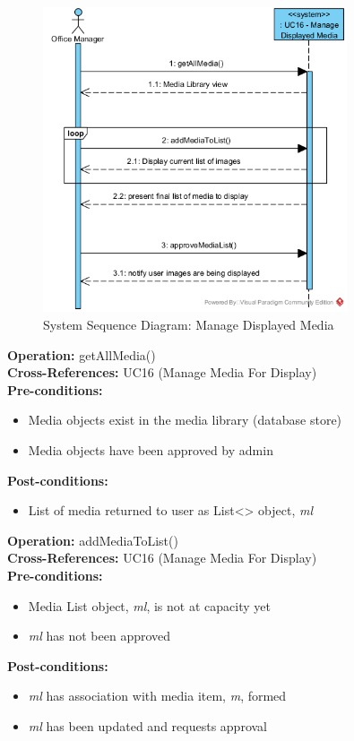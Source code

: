 \begin{figure}[H]
    \centering
    \includegraphics[width=0.8\textwidth]{images/SSD-UC16-ManageDisplayedMedia.png}
    \centering
    \caption{System Sequence Diagram: Manage Displayed Media}
\end{figure}

\textbf{Operation:} getAllMedia() \\
\textbf{Cross-References:} UC16 (Manage Media For Display) \\
\textbf{Pre-conditions:}
\begin{itemize}
    \item Media objects exist in the media library (database store)
    \item Media objects have been approved by admin
\end{itemize}
\textbf{Post-conditions:}
\begin{itemize}
    \item List of media returned to user as List<> object, \emph{ml}
\end{itemize}

\textbf{Operation:} addMediaToList() \\
\textbf{Cross-References:} UC16 (Manage Media For Display) \\
\textbf{Pre-conditions:}
\begin{itemize}
    \item Media List object, \emph{ml}, is not at capacity yet
    \item \emph{ml} has not been approved
\end{itemize}
\textbf{Post-conditions:}
\begin{itemize}
    \item \emph{ml} has association with media item, \emph{m}, formed
    \item \emph{ml} has been updated and requests approval
\end{itemize}

